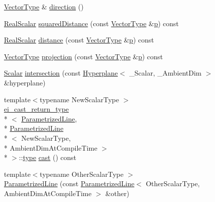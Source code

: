 \begin{DoxyCompactItemize}
\item 
\hyperlink{class_parametrized_line_a50da4abea0ab33894502d66459f261ba}{Vector\-Type} \& \hyperlink{class_parametrized_line_a053718f285d65533a2f26b18ad98cc82}{direction} ()
\item 
\hyperlink{class_parametrized_line_a5a5bc8e0f892d08922cd4152622a1ea3}{Real\-Scalar} \hyperlink{class_parametrized_line_a086f1472db36f58b1cf7b32bede144c0}{squared\-Distance} (const \hyperlink{class_parametrized_line_a50da4abea0ab33894502d66459f261ba}{Vector\-Type} \&\hyperlink{glext_8h_aa5367c14d90f462230c2611b81b41d23}{p}) const 
\item 
\hyperlink{class_parametrized_line_a5a5bc8e0f892d08922cd4152622a1ea3}{Real\-Scalar} \hyperlink{class_parametrized_line_a0b2c8fbc9ed995ed7acf4d8fc7036acd}{distance} (const \hyperlink{class_parametrized_line_a50da4abea0ab33894502d66459f261ba}{Vector\-Type} \&\hyperlink{glext_8h_aa5367c14d90f462230c2611b81b41d23}{p}) const 
\item 
\hyperlink{class_parametrized_line_a50da4abea0ab33894502d66459f261ba}{Vector\-Type} \hyperlink{class_parametrized_line_aa01c70cd21764b77e6c4cf505e1e96a9}{projection} (const \hyperlink{class_parametrized_line_a50da4abea0ab33894502d66459f261ba}{Vector\-Type} \&\hyperlink{glext_8h_aa5367c14d90f462230c2611b81b41d23}{p}) const 
\item 
\hyperlink{class_parametrized_line_ac4e083e5a62740e45d2158c6692b2115}{Scalar} \hyperlink{class_parametrized_line_a911c235c6a327e49ddeb41b22d4ff069}{intersection} (const \hyperlink{class_hyperplane}{Hyperplane}$<$ \-\_\-\-Scalar, \-\_\-\-Ambient\-Dim $>$ \&hyperplane)
\item 
{\footnotesize template$<$typename New\-Scalar\-Type $>$ }\\\hyperlink{structei__cast__return__type}{ei\-\_\-cast\-\_\-return\-\_\-type}\\*
$<$ \hyperlink{class_parametrized_line}{Parametrized\-Line}, \\*
\hyperlink{class_parametrized_line}{Parametrized\-Line}\\*
$<$ New\-Scalar\-Type, \\*
Ambient\-Dim\-At\-Compile\-Time $>$\\*
 $>$\-::\hyperlink{glext_8h_a7d05960f4f1c1b11f3177dc963a45d86}{type} \hyperlink{class_parametrized_line_a7a871f67e3d017218e441f76a0ec9dff}{cast} () const 
\item 
{\footnotesize template$<$typename Other\-Scalar\-Type $>$ }\\\hyperlink{class_parametrized_line_a33b08092fee099734ba8f1adc93ce329}{Parametrized\-Line} (const \hyperlink{class_parametrized_line}{Parametrized\-Line}$<$ Other\-Scalar\-Type, Ambient\-Dim\-At\-Compile\-Time $>$ \&other)

\end{DoxyCompactItemize}
